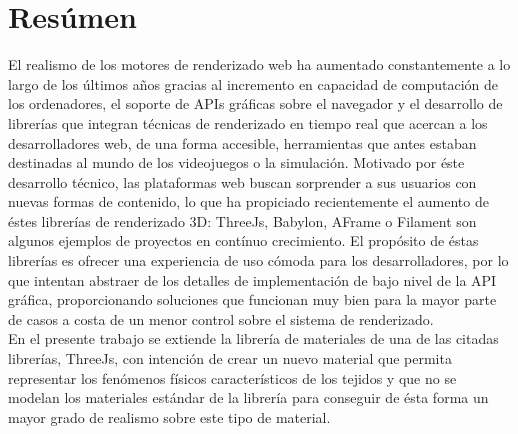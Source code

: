 \chapter{Res\'umen}

El realismo de los motores de renderizado web ha aumentado constantemente a lo largo de los \'ultimos a\~nos gracias al incremento en
capacidad de computaci\'on de los ordenadores, el soporte de APIs gr\'aficas sobre el navegador y el desarrollo de librer\'ias
que integran t\'ecnicas de renderizado en tiempo real que acercan a los desarrolladores web, de una forma accesible,
herramientas que antes estaban destinadas al mundo de los videojuegos o la simulaci\'on. Motivado por \'este desarrollo t\'ecnico,
las plataformas web buscan sorprender a sus usuarios con nuevas formas de contenido, lo que ha propiciado recientemente
el aumento de \'estes librer\'ias de renderizado 3D: ThreeJs, Babylon, AFrame o Filament son algunos ejemplos de proyectos en cont\'inuo
crecimiento. El prop\'osito de \'estas librer\'ias es ofrecer una experiencia de uso c\'omoda para los desarrolladores, por lo que intentan
abstraer de los detalles de implementaci\'on de bajo nivel de la API gr\'afica, proporcionando soluciones que funcionan muy bien
para la mayor parte de casos a costa de un menor control sobre el sistema de renderizado.\\

En el presente trabajo se extiende la librer\'ia de materiales de una de las citadas librer\'ias, ThreeJs, con intenci\'on
de crear un nuevo material que permita representar los fen\'omenos f\'isicos caracter\'isticos de los tejidos y que no se
modelan los materiales est\'andar de la librer\'ia para conseguir de \'esta forma un mayor grado de realismo sobre este tipo
de material.

